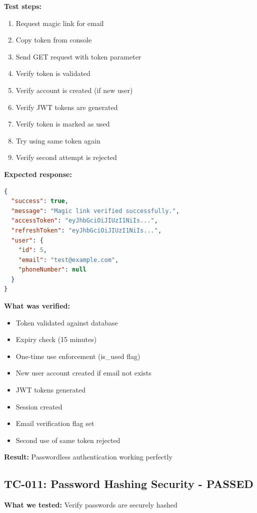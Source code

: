 \documentclass[11pt,a4paper]{article}
\begin{document}
\textbf{Test steps:}
\begin{enumerate}
    \item Request magic link for email
    \item Copy token from console
    \item Send GET request with token parameter
    \item Verify token is validated
    \item Verify account is created (if new user)
    \item Verify JWT tokens are generated
    \item Verify token is marked as used
    \item Try using same token again
    \item Verify second attempt is rejected
\end{enumerate}

\textbf{Expected response:}
\begin{lstlisting}[language=json]
{
  "success": true,
  "message": "Magic link verified successfully.",
  "accessToken": "eyJhbGciOiJIUzI1NiIs...",
  "refreshToken": "eyJhbGciOiJIUzI1NiIs...",
  "user": {
    "id": 5,
    "email": "test@example.com",
    "phoneNumber": null
  }
}
\end{lstlisting}

\textbf{What was verified:}
\begin{itemize}
    \item Token validated against database
    \item Expiry check (15 minutes)
    \item One-time use enforcement (is\_used flag)
    \item New user account created if email not exists
    \item JWT tokens generated
    \item Session created
    \item Email verification flag set
    \item Second use of same token rejected
\end{itemize}

\textbf{Result:} Passwordless authentication working perfectly

\subsection{TC-011: Password Hashing Security - PASSED}
\textbf{What we tested:} Verify passwords are securely hashed
\end{document}
